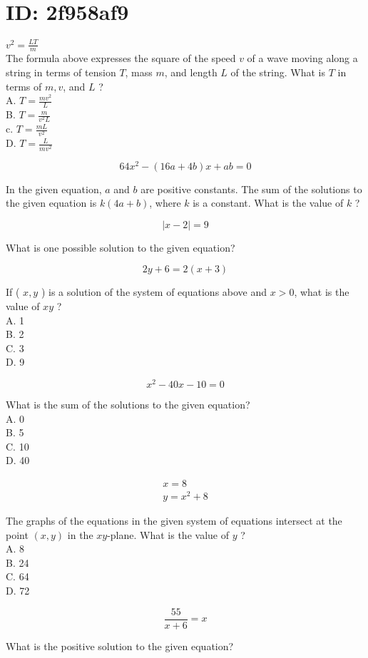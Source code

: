 \section*{ID: 2f958af9}
$v^{2}=\frac{L T}{m}$\\
The formula above expresses the square of the speed $v$ of a wave moving along a string in terms of tension $T$, mass $m$, and length $L$ of the string. What is $T$ in terms of $m, v$, and $L$ ?\\
A. $T=\frac{m v^{2}}{L}$\\
B. $T=\frac{m}{v^{2} L}$\\
c. $T=\frac{m L}{v^{2}}$\\
D. $T=\frac{L}{m v^{2}}$

$$
64 x^{2}-(16 a+4 b) x+a b=0
$$

In the given equation, $a$ and $b$ are positive constants. The sum of the solutions to the given equation is $k(4 a+b)$, where $k$ is a constant. What is the value of $k$ ?

$$
|x-2|=9
$$

What is one possible solution to the given equation?

$$
2 y+6=2(x+3)
$$

If ( $x, y$ ) is a solution of the system of equations above and $x>0$, what is the value of $x y$ ?\\
A. 1\\
B. 2\\
C. 3\\
D. 9

$$
x^{2}-40 x-10=0
$$

What is the sum of the solutions to the given equation?\\
A. 0\\
B. 5\\
C. 10\\
D. 40

$$
\begin{gathered}
x=8 \\
y=x^{2}+8
\end{gathered}
$$

The graphs of the equations in the given system of equations intersect at the point $(x, y)$ in the $x y$-plane. What is the value of $y$ ?\\
A. 8\\
B. 24\\
C. 64\\
D. 72

$$
\frac{55}{x+6}=x
$$

What is the positive solution to the given equation?

